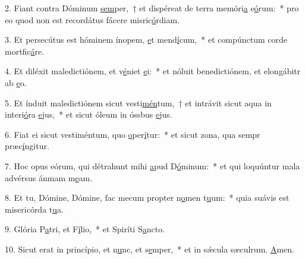 2. Fiant contra Dóminum \uline{sem}per,~† et dispéreat de terra memóri\uline{a} e\uline{ó}rum:~* pro eo quod non est recordátus fácere misric\uline{ó}rdiam.\par 
3. Et persecútus est hóminem ínopem, \uline{e}t mend\uline{í}cum,~* et compúnctum corde mortfic\uline{á}re.\par 
4. Et diléxit maledictiónem, et v\uline{é}niet \uline{e}i:~* et nóluit benedictiónem, et elongábitr ab \uline{e}o.\par 
5. Et índuit maledictiónem sicut vesti\uline{mén}tum,~† et intrávit sicut aqua in interi\uline{ó}ra \uline{e}jus,~* et sicut óleum in óssbus \uline{e}jus.\par 
6. Fiat ei sicut vestiméntum, quo \uline{o}per\uline{í}tur:~* et sicut zona, qua sempr præc\uline{í}ngitur.\par 
7. Hoc opus eórum, qui détrahunt mihi \uline{a}pud D\uline{ó}minum:~* et qui loquúntur mala advérsus ánmam m\uline{e}am.\par 
8. Et tu, Dómine, Dómine, fac mecum propter n\uline{o}men t\uline{u}um:~* quia suávis est misericórda t\uline{u}a.\par 
9. Glória P\uline{a}tri, et F\uline{í}lio,~* et Spiríti S\uline{a}ncto.\par 
10. Sicut erat in princípio, et n\uline{u}nc, et s\uline{e}mper,~* et in sǽcula sæculrum. \uline{A}men.\par 
